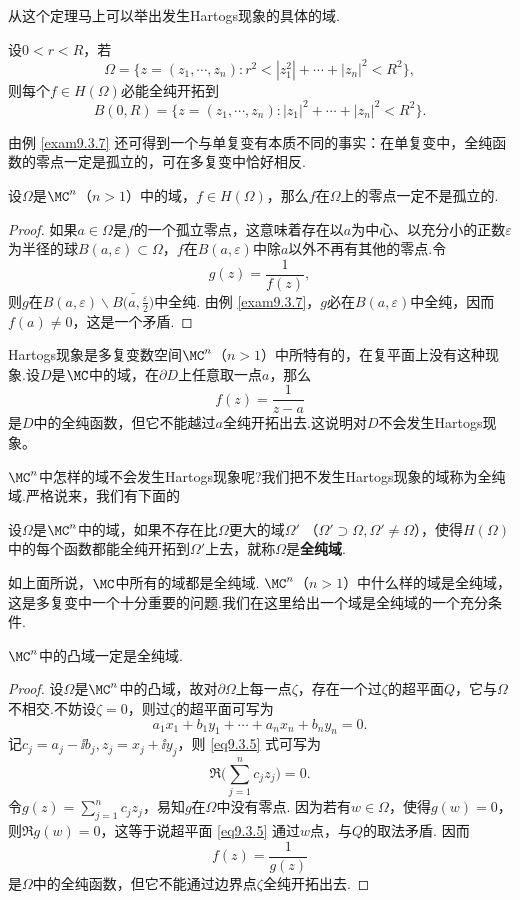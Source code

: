 从这个定理马上可以举出发生Hartogs现象的具体的域.
\begin{example}\label{exam9.3.7}
设$0<r<R$，若
\[\Omega=\{z=(z_1,\cdots,z_n):r^2<|z_1^2|+\cdots+|z_n|^2<R^2\},\]
则每个$f\in H(\Omega)$必能全纯开拓到
\[B(0,R)=\{z=(z_1,\cdots,z_n):|z_1|^2+\cdots+|z_n|^2<R^2\}.\]
\end{example}

由例 \ref{exam9.3.7} 还可得到一个与单复变有本质不同的事实：在单复变中，全纯函数的零点一定是孤立的，可在多复变中恰好相反.
\begin{theorem}\label{thm9.3.8}
  设$\Omega$是$\MC^n$（$n>1$）中的域，$f\in H(\Omega)$，那么$f$在$\Omega$上的零点一定不是孤立的.
\end{theorem}
\begin{proof}
如果$a\in\Omega$是$f$的一个孤立零点，这意味着存在以$a$为中心、以充分小的正数$\varepsilon$为半径的球$B(a,\varepsilon)\subset\Omega$，$f$在$B(a,\varepsilon)$中除$a$以外不再有其他的零点.令
\[g(z)=\frac1{f(z)},\]
则$g$在$B(a,\varepsilon)\backslash\bar{B\bigg(a,\frac\varepsilon2\bigg)}$中全纯. 由例 \ref{exam9.3.7}，$g$必在$B(a,\varepsilon)$中全纯，因而$f(a)\ne0$，这是一个矛盾.
\end{proof}

Hartogs现象是多复变数空间$\MC^n$（$n>1$）中所特有的，在复平面上没有这种现象.设$D$是$\MC$中的域，在$\partial D$上任意取一点$a$，那么
\[f(z)=\frac1{z-a}\]
是$D$中的全纯函数，但它不能越过$a$全纯开拓出去.这说明对$D$不会发生Hartogs现象。

$\MC^n$中怎样的域不会发生Hartogs现象呢?我们把不发生Hartogs现象的域称为全纯域.严格说来，我们有下面的
\begin{definition}\label{def9.3.9}
设$\Omega$是$\MC^n$中的域，如果不存在比$\Omega$更大的域$\Omega'$
（$\Omega'\supset\Omega,\Omega'\ne\Omega$），使得$H(\Omega)$中的每个函数都能全纯开拓到$\Omega'$上去，就称$\Omega$是\textbf{全纯域}.
\end{definition}

如上面所说，$\MC$中所有的域都是全纯域. $\MC^n$（$n>1$）中什么样的域是全纯域，这是多复变中一个十分重要的问题.我们在这里给出一个域是全纯域的一个充分条件.
\begin{theorem}\label{thm9.3.10}
$\MC^n$中的凸域一定是全纯域.
\end{theorem}
\begin{proof}
设$\Omega$是$\MC^n$中的凸域，故对$\partial\Omega$上每一点$\zeta$，存在一个过$\zeta$的超平面$Q$，它与$\Omega$不相交.不妨设$\zeta=0$，则过$\zeta$的超平面可写为
\begin{equation}\label{eq9.3.5}
a_1x_1+b_1y_1+\cdots+a_nx_n+b_ny_n=0.
\end{equation}
记$c_j=a_j-\ii b_j,z_j=x_j+\ii y_j$，则 \eqref{eq9.3.5} 式可写为
\[\Re\bigg(\sum_{j=1}^nc_jz_j\bigg)=0.\]
令$g(z)=\sum_{j=1}^nc_jz_j$，易知$g$在$\Omega$中没有零点. 因为若有$w\in\Omega$，使得$g(w)=0$，则$\Re g(w)=0$，这等于说超平面 \eqref{eq9.3.5} 通过$w$点，与$Q$的取法矛盾. 因而
\[f(z)=\frac1{g(z)}\]
是$\Omega$中的全纯函数，但它不能通过边界点$\zeta$全纯开拓出去.
\end{proof}

